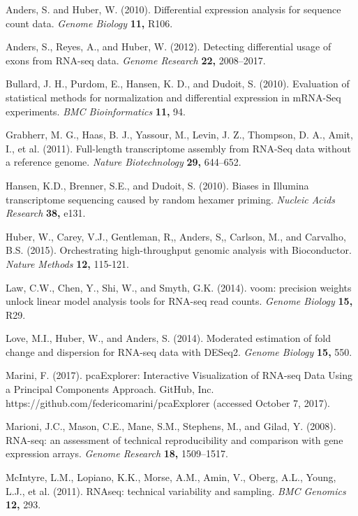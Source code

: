\documentclass[useAMS,referee]{biom}
\begin{document}
\begin{thebibliography}{}

\bibitem{ } Anders, S. and Huber, W. (2010). Differential expression analysis for sequence count data. \textit{Genome Biology} \textbf{11,} R106.

\bibitem{ } Anders, S., Reyes, A., and Huber, W. (2012). Detecting differential usage of exons from RNA-seq data. \textit{Genome Research} \textbf{22,} 2008–2017.

\bibitem{ } Bullard, J. H., Purdom, E., Hansen, K. D., and Dudoit, S. (2010). Evaluation of statistical methods for normalization and differential expression in mRNA-Seq experiments. \textit{BMC Bioinformatics} \textbf{11,} 94.

\bibitem{ } Grabherr, M. G., Haas, B. J., Yassour, M., Levin, J. Z., Thompson, D. A., Amit, I., et al. (2011). Full-length transcriptome assembly from RNA-Seq data without a reference genome. \textit{Nature Biotechnology} \textbf{29,} 644–652.

\bibitem{ } Hansen, K.D., Brenner, S.E., and Dudoit, S. (2010). Biases in Illumina transcriptome sequencing caused by random hexamer priming. \textit{Nucleic Acids Research} \textbf{38,} e131.

\bibitem{ } Huber, W., Carey, V.J., Gentleman, R,, Anders, S,, Carlson, M., and Carvalho, B.S. (2015). Orchestrating high-throughput genomic analysis with Bioconductor. \textit{Nature Methods} \textbf{12,} 115-121.

\bibitem{ } Law, C.W., Chen, Y., Shi, W., and Smyth, G.K. (2014). voom: precision weights unlock linear model analysis tools for RNA-seq read counts. \textit{Genome Biology} \textbf{15,} R29.

\bibitem{ } Love, M.I., Huber, W., and Anders, S. (2014). Moderated estimation of fold change and dispersion for RNA-seq data with DESeq2. \textit{Genome Biology} \textbf{15,} 550.

\bibitem{ } Marini, F. (2017). pcaExplorer: Interactive Visualization of RNA-seq Data Using a Principal Components Approach. GitHub, Inc. https://github.com/federicomarini/pcaExplorer (accessed October 7, 2017).

\bibitem{ } Marioni, J.C., Mason, C.E., Mane, S.M., Stephens, M., and Gilad, Y. (2008). RNA-seq: an assessment of technical reproducibility and comparison with gene expression arrays. \textit{Genome Research} \textbf{18,} 1509–1517.

\bibitem{ } McIntyre, L.M., Lopiano, K.K., Morse, A.M., Amin, V., Oberg, A.L., Young, L.J., et al. (2011). RNAseq: technical variability and sampling. \textit{BMC Genomics} \textbf{12,} 293.


\end{thebibliography}
\end{document}
